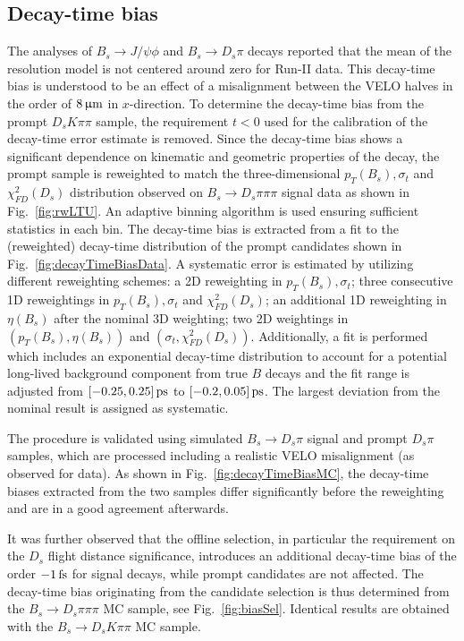 \clearpage
\subsection{Decay-time bias}
\label{ssec:bias}


The analyses of $B_s \to J/\psi \phi$\cite{Aaij:2019vot} and $B_s \to D_s \pi$\cite{DspiRun2} decays 
reported that the mean of the resolution model is not centered around zero for Run-II data.
This decay-time bias is understood to be an effect of a misalignment
between the VELO halves in the order of $8{\,\upmu\mathrm{m}}$ in $x$-direction.
To determine the decay-time bias from the prompt $D_sK\pi\pi$ sample, the requirement $t<0$ used for the calibration of the decay-time error estimate is removed.
Since the decay-time bias shows a significant dependence on kinematic and geometric properties of the decay, 
the prompt sample is reweighted to match the three-dimensional $p_T(B_s),\sigma_t$ and $\chi^{2}_{FD}(D_s)$
distribution observed on $B_s \to D_s \pi\pi\pi$ signal data as shown in Fig.~\ref{fig:rwLTU}.
An adaptive binning algorithm is used ensuring sufficient statistics in each bin.
The decay-time bias is extracted from a fit to the (reweighted) decay-time distribution of the prompt candidates shown in Fig.~\ref{fig:decayTimeBiasData}.
A systematic error is estimated by utilizing different reweighting schemes: 
a 2D reweighting in $p_T(B_s),\sigma_t$; 
three consecutive 1D reweightings in $p_T(B_s),\sigma_t$ and $\chi^{2}_{FD}(D_s)$;
an additional 1D reweighting in $\eta(B_s)$ after the nominal 3D weighting;
two 2D weightings in $(p_T(B_s), \eta(B_s))$ and $(\sigma_t, \chi^{2}_{FD}(D_s))$.
Additionally, a fit is performed which includes an exponential decay-time distribution to account for a potential long-lived background component from true $B$ decays
and the fit range is adjusted from $[-0.25,0.25]{\mathrm{ \,ps}}$ to $[-0.2,0.05]{\mathrm{ \,ps}}$.
The largest deviation from the nominal result is assigned as systematic.

The procedure is validated using simulated $B_s \to D_s \pi$ signal and prompt $D_s \pi$  samples, 
which are processed including a realistic VELO misalignment (as observed for data).
As shown in Fig.~\ref{fig:decayTimeBiasMC}, the decay-time biases extracted from the two samples differ significantly before the reweighting 
and are in a good agreement afterwards.

It was further observed that the offline selection, in particular the requirement on the $D_s$ flight distance significance, introduces an additional decay-time bias of the order $-1\mathrm{ \,fs}$
for signal decays, while prompt candidates are not affected.
The decay-time bias originating from the candidate selection is thus 
determined from the $B_s \to D_s  \pi\pi\pi$ MC sample, see Fig.~\ref{fig:biasSel}.
Identical results are obtained with the $B_s \to D_s  K\pi\pi$ MC sample.


